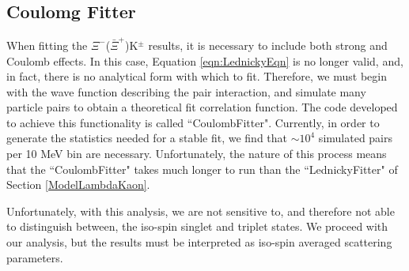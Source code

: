\documentclass[../AnalysisNoteJBuxton.tex]{subfiles}
\begin{document}
\subsection{Coulomg Fitter}
\label{CoulombFitter}

When fitting the $\Xi^{-}$($\bar{\Xi}^{+}$)K$^{\pm}$ results, it is necessary to include both strong and Coulomb effects.
In this case, Equation \ref{eqn:LednickyEqn} is no longer valid, and, in fact, there is no analytical form with which to fit.
Therefore, we must begin with the wave function describing the pair interaction, and simulate many particle pairs to obtain a theoretical fit correlation function.
The code developed to achieve this functionality is called ``CoulombFitter".
Currently, in order to generate the statistics needed for a stable fit, we find that $\sim 10^{4}$ simulated pairs per 10 MeV bin are necessary.
Unfortunately, the nature of this process means that the ``CoulombFitter" takes much longer to run than the ``LednickyFitter" of Section \ref{ModelLambdaKaon}.


Unfortunately, with this analysis, we are not sensitive to, and therefore not able to distinguish between, the iso-spin singlet and triplet states.  We proceed with our analysis, but the results must be interpreted as iso-spin averaged scattering parameters.

\begin{comment}
\begin{equation}
\begin{array}{l}
\vspace{2mm}
  C(\mathbf{k^{*}}) = \sum\limits_{S}\rho_{S}\int S(\mathbf{r^{*}})|\Psi^{S}_{\mathbf{k^{*}}}(\mathbf{r^{*}})|^{2}d^{3}\mathbf{r^{*}} \\
\vspace{3mm}
  ~~~~~\Psi_{\mathbf{k^{*}}}(\mathbf{r^{*}}) = e^{i\delta_{c}}\sqrt{A_{c}(\eta)}[e^{i\mathbf{k^{*}} \cdot \mathbf{r^{*}}}F(-i\eta,1,i\xi) + f_{c}(k^{*})\frac{\tilde{G}(\rho,\eta)}{r^{*}}] \\
\vspace{3mm}
  ~~~~~f_{c}(k^{*}) = [\frac{1}{f_{0}} + \frac{1}{2}d_{0}k^{*2} - \frac{2}{a_{c}}h(\eta) - ik^{*}A_{c}(\eta)]^{-1} \\
\vspace{3mm}
  ~~~~~\rho = k^{*}r^{*};~ \eta = (k^{*}a)^{-1};~ a_{c} = (\mu z_{1}z_{2}e^{2})^{-1} \\  
\vspace{2mm}
  ~~~~~\xi = \mathbf{k^{*}} \cdot \mathbf{r^{*}} + k^{*}r^{*} \equiv \rho(1+\cos\theta^{*}) \\
\end{array}
\label{eqn:CoulombEqn}
\end{equation}
\end{comment}
\end{document}
